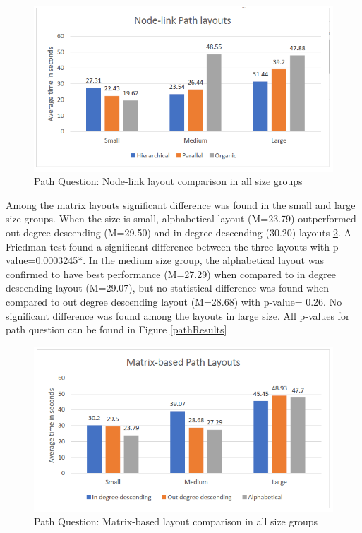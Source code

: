 \documentclass{l4proj}
\begin{document}
\begin{figure}[H]
\centering
\includegraphics[width=13cm]{images/nodePathLayouts.PNG}
\caption{Path Question: Node-link layout comparison in all size groups}
\label{nodePathLayouts}
\end{figure}

Among the matrix layouts significant difference was found in the small and large size groups. When the size is small, alphabetical layout (M=23.79) outperformed out degree descending (M=29.50) and in degree descending (30.20) layouts \ref{matrixpathlayouts}. A Friedman test found a significant difference between the three layouts with p-value=0.0003245*. In the medium size group, the alphabetical layout was confirmed to have best performance (M=27.29) when compared to in degree descending layout (M=29.07), but no statistical difference was found when compared to out degree descending layout (M=28.68) with p-value= 0.26. No significant difference was found among the layouts in large size. All p-values for path question can be found in Figure \ref{pathResults} 


\begin{figure}[H]
\centering
\includegraphics[width=13cm]{images/matrixpathlayouts.PNG}
\caption{Path Question: Matrix-based layout comparison in all size groups}
\label{matrixpathlayouts}
\end{figure}
\end{document}
